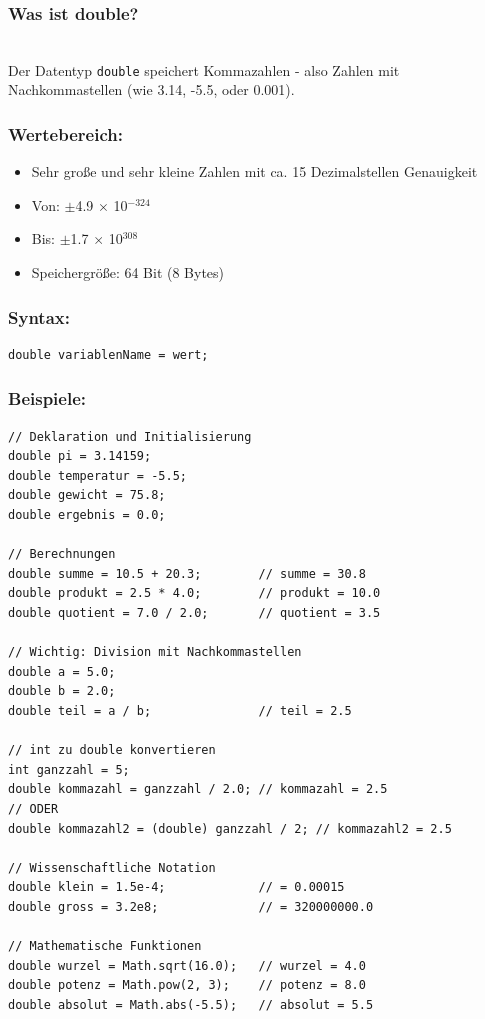 \subsubsection*{Was ist double?}\\
Der Datentyp \texttt{double} speichert Kommazahlen - also Zahlen mit Nachkommastellen (wie 3.14, -5.5, oder 0.001).

\subsubsection*{Wertebereich:}
\begin{itemize}
	\item Sehr große und sehr kleine Zahlen mit ca. 15 Dezimalstellen Genauigkeit
	\item Von: $\pm$4.9 $\times$ 10$^{-324}$
	\item Bis: $\pm$1.7 $\times$ 10$^{308}$
	\item Speichergröße: 64 Bit (8 Bytes)
\end{itemize}

\subsubsection*{Syntax:}
\begin{lstlisting}
double variablenName = wert;
\end{lstlisting}

\subsubsection*{Beispiele:}
\begin{lstlisting}
// Deklaration und Initialisierung
double pi = 3.14159;
double temperatur = -5.5;
double gewicht = 75.8;
double ergebnis = 0.0;

// Berechnungen
double summe = 10.5 + 20.3;        // summe = 30.8
double produkt = 2.5 * 4.0;        // produkt = 10.0
double quotient = 7.0 / 2.0;       // quotient = 3.5

// Wichtig: Division mit Nachkommastellen
double a = 5.0;
double b = 2.0;
double teil = a / b;               // teil = 2.5

// int zu double konvertieren
int ganzzahl = 5;
double kommazahl = ganzzahl / 2.0; // kommazahl = 2.5
// ODER
double kommazahl2 = (double) ganzzahl / 2; // kommazahl2 = 2.5

// Wissenschaftliche Notation
double klein = 1.5e-4;             // = 0.00015
double gross = 3.2e8;              // = 320000000.0

// Mathematische Funktionen
double wurzel = Math.sqrt(16.0);   // wurzel = 4.0
double potenz = Math.pow(2, 3);    // potenz = 8.0
double absolut = Math.abs(-5.5);   // absolut = 5.5
\end{lstlisting}

